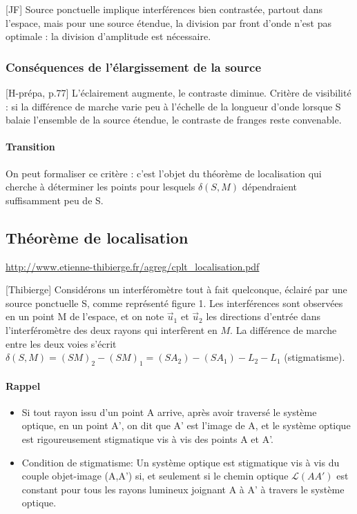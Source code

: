 \documentclass[11pt]{report}
\numberwithin{figure}{section}
\numberwithin{equation}{section}
\numberwithin{table}{section}
\newcommand{\1}{\boldsymbol{1}}
\begin{document}
[JF] Source ponctuelle implique interférences bien contrastée, partout dans l’espace, mais pour une source étendue,
la division par front d’onde n’est pas optimale : la division d’amplitude est nécessaire.

\subsubsection{Conséquences de l'élargissement de la source}

[H-prépa, p.77] L'éclairement augmente, le contraste diminue. Critère de visibilité : si la différence de marche varie peu à l'échelle de la longueur d'onde lorsque S balaie l'ensemble de la source étendue, le contraste de franges reste convenable.

\paragraph{Transition} On peut formaliser ce critère : c'est l'objet du théorème de localisation qui cherche à déterminer les points pour lesquels $\delta(S,M)$ dépendraient suffisamment peu de S.

\subsection{Théorème de localisation}

\url{http://www.etienne-thibierge.fr/agreg/cplt_localisation.pdf}

[Thibierge] Considérons un interféromètre tout à fait quelconque, éclairé par une source ponctuelle S, comme représenté figure 1. Les interférences sont observées en un point M de l’espace, et on note $\vec{u}_1$ et $\vec{u}_2$ les directions d’entrée dans l’interféromètre des deux rayons qui interfèrent en $M$. La différence de marche entre les deux voies s’écrit $\delta(S,M) = (SM)_2 - (SM)_1 = (SA_2) - (SA_1) - L_2 - L_1$ (stigmatisme).


\paragraph{Rappel}
\begin{itemize}
\item Si tout rayon issu d'un point A arrive, après avoir traversé le système optique, en un point A', on dit que A' est l'image de A, et le système optique est rigoureusement stigmatique vis à vis des points A et A'.
\item Condition de stigmatisme: Un système optique est stigmatique vis à vis du couple objet-image (A,A') si, et seulement si le chemin optique $\mathcal{L}(AA')$ est constant pour tous les rayons lumineux joignant A à A' à travers le système optique.
\end{itemize}
\end{document}
